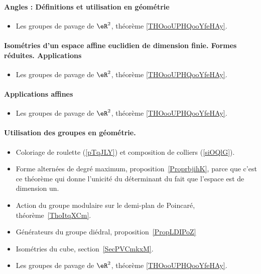 \paragraph{Angles : Définitions et utilisation en géométrie}
\begin{itemize}
    \item Les groupes de pavage de \( \eR^2\), théorème \ref{THOooUPHQooYfeHAy}.
\end{itemize}
\paragraph{Isométries d'un espace affine euclidien de dimension finie. Formes réduites. Applications}
\begin{itemize}
    \item Les groupes de pavage de \( \eR^2\), théorème \ref{THOooUPHQooYfeHAy}.
\end{itemize}
\paragraph{Applications affines}
\begin{itemize}
    \item Les groupes de pavage de \( \eR^2\), théorème \ref{THOooUPHQooYfeHAy}.
\end{itemize}
\paragraph{Utilisation des groupes en géométrie.}
\begin{itemize}
    \item Coloriage de roulette (\ref{pTqJLY}) et composition de colliers (\ref{siOQlG}).
    \item Forme alternées de degré maximum, proposition~\ref{ProprbjihK}, parce que c'est ce théorème qui donne l'unicité du déterminant du fait que l'espace est de dimension un.
    \item Action du groupe modulaire sur le demi-plan de Poincaré, théorème~\ref{ThoItqXCm}.
    \item Générateurs du groupe diédral, proposition~\ref{PropLDIPoZ}
    \item Isométries du cube, section~\ref{SecPVCmkxM}.
    \item Les groupes de pavage de \( \eR^2\), théorème \ref{THOooUPHQooYfeHAy}.
\end{itemize}


